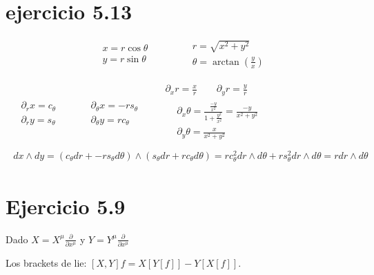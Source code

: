 \documentclass{article}
\begin{document}
\section{ejercicio 5.13 }
\[
\begin{aligned}
  & x = r\cos{\theta} \\ 
  & y = r\sin{\theta}
\end{aligned} \quad \quad \quad \begin{aligned} & r = \sqrt{ x^2 + y^2 } \\ & \theta = \arctan{ \left( \frac{y}{x} \right) } \end{aligned}
\]

\[
\begin{gathered}
  \begin{aligned}
    & \partial_r x = c_{\theta} \\ 
    & \partial_r y = s_{\theta} 
  \end{aligned} \quad \quad \begin{aligned}
    & \partial_{\theta} x = -rs_{\theta} \\ 
    & \partial_{\theta} y = rc_{\theta}
\end{aligned} \quad \quad \begin{aligned}
    \partial_x r = \frac{x}{r} \quad \quad \partial_y r = \frac{y}{r} \\
    \begin{aligned}
      & \partial_x \theta = \frac{ \frac{-y}{x^2} }{ 1 + \frac{y^2}{x^2} } = \frac{-y}{ x^2 + y^2 } \\
      & \partial_y \theta = \frac{x}{ x^2 + y^2 }
\end{aligned}
\end{aligned} \\
\begin{aligned}
  dx \wedge dy = (c_{\theta} dr + - rs_{\theta} d\theta ) \wedge (s_{\theta}dr + rc_{\theta} d\theta ) = rc_{\theta}^2 dr \wedge d\theta + rs_{\theta}^2 dr \wedge d\theta = rdr \wedge d\theta
\end{aligned}
\end{gathered}
\]


\section{Ejercicio 5.9}
Dado $X = X^{\mu} \frac{ \partial }{ \partial x^{\mu }}$ y $Y = Y^{\mu} \frac{ \partial }{ \partial x^{\mu }}$

Los brackets de lie:  $[X,Y]f = X[Y[f]] - Y[X[f]]$.  
\end{document}
